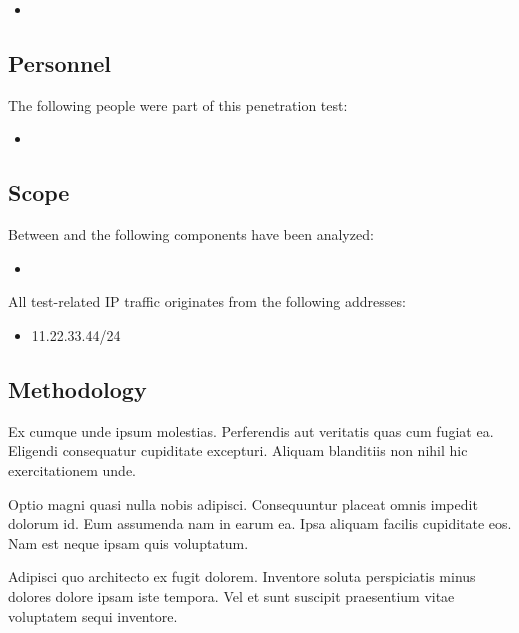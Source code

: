 \begin{itemize}
    \item {}
\end{itemize}

\subsection{Personnel}

The following people were part of this penetration test:

\begin{itemize}
    \item {}
\end{itemize}

\subsection{Scope}

Between  and  the following components have been analyzed:

\begin{itemize}
    \item {}
\end{itemize}

All test-related IP traffic originates from the following addresses:

\begin{itemize}
  \item 11.22.33.44/24
\end{itemize}

\subsection{Methodology}

Ex cumque unde ipsum molestias.
Perferendis aut veritatis quas cum fugiat ea.
Eligendi consequatur cupiditate excepturi.
Aliquam blanditiis non nihil hic exercitationem unde.

Optio magni quasi nulla nobis adipisci.
Consequuntur placeat omnis impedit dolorum id.
Eum assumenda nam in earum ea.
Ipsa aliquam facilis cupiditate eos.
Nam est neque ipsam quis voluptatum.

Adipisci quo architecto ex fugit dolorem.
Inventore soluta perspiciatis minus dolores dolore ipsam iste tempora.
Vel et sunt suscipit praesentium vitae voluptatem sequi inventore.

